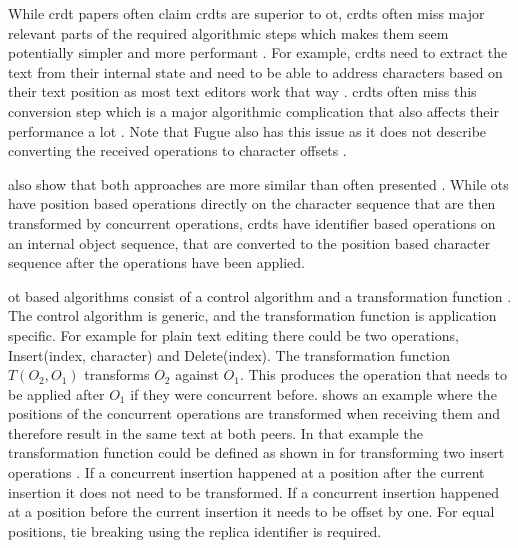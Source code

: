 While \gls{crdt} papers often claim \glspl{crdt} are superior to \gls{ot}, \glspl{crdt} often miss major relevant parts of the required algorithmic steps which makes them seem potentially simpler and more performant \cite[page 2]{2019-sun-difference-ot-crdt-1-general-transformation-framework}. For example, \glspl{crdt} need to extract the text from their internal state and need to be able to address characters based on their text position as most text editors work that way \cite[Section 5.1, Section 5.2]{2019-sun-difference-ot-crdt-1-general-transformation-framework}. \Glspl{crdt} often miss this conversion step which is a major algorithmic complication that also affects their performance a lot \cite[page 2]{2019-sun-difference-ot-crdt-1-general-transformation-framework}. Note that Fugue also has this issue as it does not describe converting the received operations to character offsets \cite[Algorithm 1]{2023-weidner-minimizing-interleaving}.

 also show that both approaches are more similar than often presented \cite[Section 4.1 Table 1]{2019-sun-difference-ot-crdt-1-general-transformation-framework}. While \glspl{ot} have position based operations directly on the character sequence that are then transformed by concurrent operations, \glspl{crdt} have identifier based operations on an internal object sequence, that are converted to the position based character sequence after the operations have been applied.

\gls{ot} based algorithms consist of a control algorithm and a transformation function \cite{2024-sun-ot-faq}. The control algorithm is generic, and the transformation function is application specific. For example for plain text editing there could be two operations, Insert(index, character) and Delete(index). The transformation function $T(O_2, O_1)$ transforms $O_2$ against $O_1$. This produces the operation that needs to be applied after $O_1$ if they were concurrent before.  shows an example where the positions of the concurrent operations are transformed when receiving them and therefore result in the same text at both peers. In that example the transformation function could be defined as shown in  for transforming two insert operations \cite[Section 2.15]{2024-sun-ot-faq}. If a concurrent insertion happened at a position after the current insertion it does not need to be transformed. If a concurrent insertion happened at a position before the current insertion it needs to be offset by one. For equal positions, tie breaking using the replica identifier is required.

